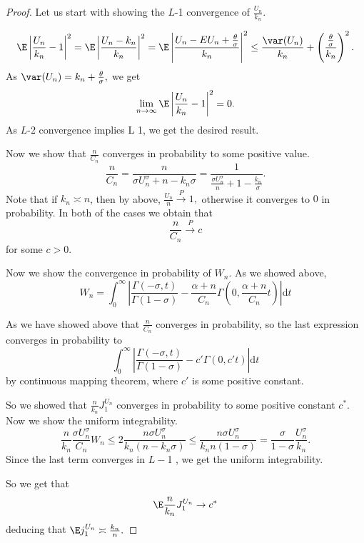 \begin{proof}
    Let us start with showing the $L$-1 convergence of $\frac{U_n}{k_n}.$

    \[
    \E \left| \frac{U_n}{k_n} - 1\right|^2 = \E \left| \frac{U_n-k_n}{k_n}{}\right|^2 = \E \left| \frac{U_n-E U_n + \frac{\theta}{\sigma}}{k_n}{}\right|^2 \leq \frac{\var(U_n)}{k_n} + \left(\frac{\frac{\theta}{\sigma}}{k_n} \right)^2.
    \]
    As $\var(U_n) = k_n + \frac{\theta}{\sigma},$ we get 
    \[
    \lim_{n\to \infty}\E \left|\frac{U_n}{k_n} - 1 \right|^2 = 0.
    \]
    As $L$-2 convergence implies L 1, we get the desired result.

    Now we show that $\frac{n}{C_n}$ converges in probability to some positive value.
    \[
    \frac{n}{C_n} = \frac{n}{\sigma U_n^\sigma + n - k_n\sigma} = \frac{1}{\frac{\sigma U_n^\sigma}{n}+ 1 - \frac{k_n}{\sigma}}.
    \]
    Note that if $k_n \asymp n$, then by above, $\frac{U_n}{n} \overset{P}{\to} 1,$ otherwise it converges to $0$ in probability. In both of the cases we obtain that 
    \[
    \frac{n}{C_n} \overset{P}{\to} c
    \]
    for some $c > 0.$

    Now we show the convergence in probability of $W_n.$ As we showed above,
    \[
    W_n = \int_0^\infty \left| \frac{\Gamma(-\sigma, t)}{\Gamma(1-\sigma)}- \frac{\alpha + n}{C_n}\Gamma\left( 0, \frac{\alpha + n}{C_n}t\right)\right|\mathrm{d}t
    \]
    
    As we have showed above that $\frac{n}{C_n}$ converges in probability, so the last expression converges in probability to 
    \[
    \int_0^\infty \left| \frac{\Gamma(-\sigma, t)}{\Gamma(1-\sigma)} - c'\Gamma(0,c't) \right|\mathrm{d}t
    \]
    by continuous mapping theorem, where $c'$ is some positive constant.

    So we showed that $\frac{n}{k_n}J_1^{U_n}$ converges in probability to some positive constant $c^*.$ Now we show the uniform integrability.
    \[
    \frac{n}{k_n}\frac{\sigma U_n^\sigma}{C_n} W_n \leq 2\frac{n\sigma U_n^\sigma}{k_n(n-k_n\sigma)}\leq \frac{n \sigma U_n^\sigma}{k_n n(1-\sigma)} = \frac{\sigma}{1-\sigma}\frac{U_n^\sigma}{k_n}.
    \]
    Since the last term converges in $L-$1 , we get the uniform integrability.

    So we get that 
    \[
    \E \frac{n}{k_n}J_1^{U_n} \to c^*
    \] deducing that $\E j_1^{U_n} \asymp \frac{k_n}{n}.$


\end{proof}
